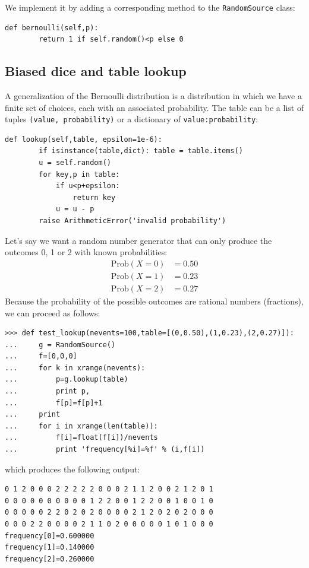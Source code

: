 \documentclass[justified,sixbynine]{tufte-book}
\def\ft{\small\tt}
\theoremstyle{plain}%
\theoremstyle{definition}
\theoremstyle{remark}
\begin{document}
\begin{fullwidth}
We implement it by adding a corresponding method to the {\ft RandomSource} class:

\begin{lstlisting}[caption={in file: {\ft nlib.py}}]
    def bernoulli(self,p):
        return 1 if self.random()<p else 0
\end{lstlisting}

\goodbreak\subsection{Biased dice and table lookup}

A generalization of the Bernoulli distribution is a distribution in which we have a finite set of choices, each with an associated probability. The table can be a list of tuples {\ft (value, probability)} or a dictionary of {\ft value:probability}:

\begin{lstlisting}[caption={in file: {\ft nlib.py}}]
    def lookup(self,table, epsilon=1e-6):
        if isinstance(table,dict): table = table.items()
        u = self.random()
        for key,p in table:
            if u<p+epsilon:
                return key
            u = u - p
        raise ArithmeticError('invalid probability')
\end{lstlisting}

Let's say we want a random number generator that can only produce the
outcomes 0, 1 or 2 with known probabilities:
\begin{align}
\textrm{Prob}(X=0) &= 0.50 \\
\textrm{Prob}(X=1) &= 0.23 \\
\textrm{Prob}(X=2) &= 0.27
\end{align}
Because the probability of the possible outcomes are rational numbers
(fractions), we can proceed as follows:
\begin{lstlisting}
>>> def test_lookup(nevents=100,table=[(0,0.50),(1,0.23),(2,0.27)]):
...     g = RandomSource()
...     f=[0,0,0]
...     for k in xrange(nevents):
...         p=g.lookup(table)
...         print p,
...         f[p]=f[p]+1
...     print
...     for i in xrange(len(table)):
...         f[i]=float(f[i])/nevents
...         print 'frequency[%i]=%f' % (i,f[i])
\end{lstlisting}

which produces the following output:

\begin{lstlisting}
0 1 2 0 0 0 2 2 2 2 2 0 0 0 2 1 1 2 0 0 2 1 2 0 1
0 0 0 0 0 0 0 0 0 0 1 2 2 0 0 1 2 2 0 0 1 0 0 1 0
0 0 0 0 0 2 2 0 2 0 2 0 0 0 0 2 1 2 0 2 0 2 0 0 0
0 0 0 2 2 0 0 0 0 2 1 1 0 2 0 0 0 0 0 1 0 1 0 0 0
frequency[0]=0.600000
frequency[1]=0.140000
frequency[2]=0.260000
\end{lstlisting}


\end{fullwidth}
\end{document}
